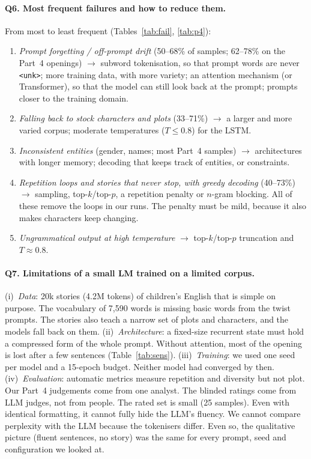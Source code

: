 \documentclass[11pt,a4paper]{article}
\begin{document}
\paragraph{Q6. Most frequent failures and how to reduce them.} From most to least frequent
(Tables~\ref{tab:fail}, \ref{tab:p4}):
\begin{enumerate}
\item \emph{Prompt forgetting / off-prompt drift} (50--68\% of samples; 62--78\% on the Part~4
  openings) $\rightarrow$ subword tokenisation, so that prompt words are never \texttt{<unk>}; more
  training data, with more variety; an attention mechanism (or Transformer), so that the model can
  still look back at the prompt; prompts closer to the training domain.
\item \emph{Falling back to stock characters and plots} (33--71\%) $\rightarrow$ a larger and more
  varied corpus; moderate temperatures ($T\leq0.8$) for the LSTM.
\item \emph{Inconsistent entities} (gender, names; most Part~4 samples) $\rightarrow$ architectures
  with longer memory; decoding that keeps track of entities, or constraints.
\item \emph{Repetition loops and stories that never stop, with greedy decoding} (40--73\%)
  $\rightarrow$ sampling, top-$k$/top-$p$, a repetition penalty or $n$-gram blocking. All of these
  remove the loops in our runs. The penalty must be mild, because it also makes characters keep
  changing.
\item \emph{Ungrammatical output at high temperature} $\rightarrow$ top-$k$/top-$p$ truncation and
  $T\approx0.8$.
\end{enumerate}

\paragraph{Q7. Limitations of a small LM trained on a limited corpus.} (i)~\emph{Data}: 20k stories
(4.2M tokens) of children's English that is simple on purpose. The vocabulary of 7,590 words is
missing basic words from the twist prompts. The stories also teach a narrow set of plots and
characters, and the models fall back on them. (ii)~\emph{Architecture}: a fixed-size recurrent
state must hold a compressed form of the whole prompt. Without attention, most of the opening is
lost after a few sentences (Table~\ref{tab:sens}). (iii)~\emph{Training}: we used one seed per
model and a 15-epoch budget. Neither model had converged by then. (iv)~\emph{Evaluation}:
automatic metrics measure repetition and diversity but not plot. Our Part~4 judgements come from
one analyst. The blinded ratings come from LLM judges, not from people. The rated set is small
(25 samples). Even with identical formatting, it cannot fully hide the LLM's fluency. We cannot
compare perplexity with the LLM because the tokenisers differ. Even so, the qualitative picture
(fluent sentences, no story) was the same for every prompt, seed and configuration we looked at.
\end{document}
